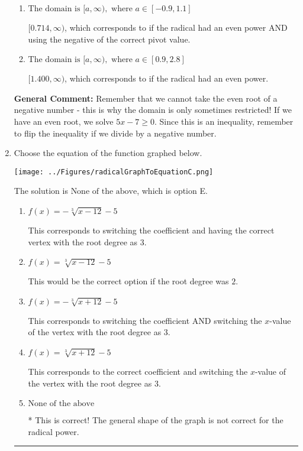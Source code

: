 \documentclass{extbook}[14pt]
\newcommand{\litem}[1]{\item #1

\rule{\textwidth}{0.4pt}}
\begin{document}
\begin{enumerate}
{\begin{enumerate}[label=\Alph*.]
$(-\infty, 1.400]$, which corresponds to if the radical had an even power AND reversing the direction of the domain.
\item \( \text{The domain is } [a, \infty), \text{   where } a \in [-0.9, 1.1] \)

$[0.714, \infty)$, which corresponds to if the radical had an even power AND using the negative of the correct pivot value.
\item \( \text{The domain is } [a, \infty), \text{   where } a \in [0.9, 2.8] \)

$[1.400, \infty)$, which corresponds to if the radical had an even power.
\end{enumerate}

\textbf{General Comment:} Remember that we cannot take the even root of a negative number - this is why the domain is only sometimes restricted! If we have an even root, we solve $5 x - 7 \geq 0$. Since this is an inequality, remember to flip the inequality if we divide by a negative number.
}
\litem{
Choose the equation of the function graphed below.

\begin{center}
    \texttt{[image: ../Figures/radicalGraphToEquationC.png]}
\end{center}


The solution is \( \text{None of the above} \), which is option E.\begin{enumerate}[label=\Alph*.]
\item \( f(x) = - \sqrt[3]{x - 12} - 5 \)

This corresponds to switching the coefficient and having the correct vertex with the root degree as $3$.
\item \( f(x) = \sqrt[3]{x - 12} - 5 \)

This would be the correct option if the root degree was $2$.
\item \( f(x) = - \sqrt[3]{x + 12} - 5 \)

This corresponds to switching the coefficient AND switching the $x$-value of the vertex with the root degree as $3$.
\item \( f(x) = \sqrt[3]{x + 12} - 5 \)

This corresponds to the correct coefficient and switching the $x$-value of the vertex with the root degree as $3$.
\item \( \text{None of the above} \)

* This is correct! The general shape of the graph is not correct for the radical power.
\end{enumerate}

}
\end{enumerate}
\end{document}
